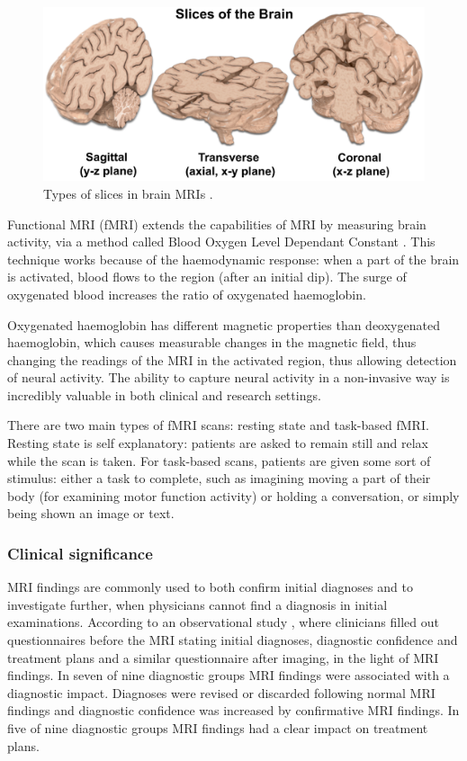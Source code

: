 	\begin{figure}[!h]
		\centering
		\includegraphics[width=\textwidth]{figures/slice_types.png}
		\caption{Types of slices in brain MRIs \cite{mripage}.}
	\end{figure}
	
	Functional MRI (fMRI) extends the capabilities of MRI by measuring brain activity, via a method called Blood Oxygen Level Dependant Constant \cite{glover2011overview}. This technique works because of the haemodynamic response: when a part of the brain is activated, blood flows to the region (after an initial dip). The surge of oxygenated blood increases the ratio of oxygenated haemoglobin.
	
	Oxygenated haemoglobin has different magnetic properties than deoxygenated haemoglobin, which causes measurable changes in the magnetic field, thus changing the readings of the MRI in the activated region, thus allowing detection of neural activity. The ability to capture neural activity in a non-invasive way is incredibly valuable in both clinical and research settings.
	
	There are two main types of fMRI scans: resting state and task-based fMRI. Resting state is self explanatory: patients are asked to remain still and relax while the scan is taken. For task-based scans, patients are given some sort of stimulus: either a task to complete, such as imagining moving a part of their body (for examining motor function activity) or holding a conversation, or simply being shown an image or text. 
	
		\subsubsection{Clinical significance}
		
		MRI findings are commonly used to both confirm initial diagnoses and to investigate further, when physicians cannot find a diagnosis in initial examinations.  According to an observational study \cite{hollingworth2000diagnostic}, where clinicians filled out questionnaires before the MRI stating initial diagnoses, diagnostic confidence and treatment plans and a similar questionnaire after imaging, in the light of MRI findings. In seven of nine diagnostic groups MRI findings were associated with a diagnostic impact. Diagnoses were revised or discarded following normal MRI findings and diagnostic confidence was increased by confirmative MRI findings. In five of nine diagnostic groups MRI findings had a clear impact on treatment plans. 

